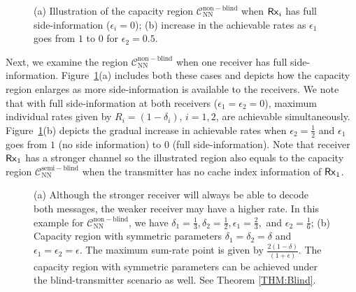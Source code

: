 \documentclass[journal,12pt,draftcls,onecolumn]{IEEEtran}
\begin{document}
\begin{figure}[!ht]
\centering
{}
\caption{(a) Illustration of the capacity region $\mathcal{C}^{\mathrm{non-blind}}_{\mathrm{NN}}$ when ${\sf Rx}_i$ has full side-information ($\epsilon_i = 0$); (b) increase in the achievable rates as $\epsilon_1$ goes from $1$ to $0$ for $\epsilon_2 = 0.5$.\label{Fig:Example1}}
\end{figure}

Next, we examine the region $\mathcal{C}^{\mathrm{non-blind}}_{\mathrm{NN}}$ when one receiver has full side-information. Figure~\ref{Fig:Example1}(a) includes both these cases and depicts how the capacity region enlarges as more side-information is available to the receivers. We note that with full side-information at both receivers ($\epsilon_1 = \epsilon_2 = 0$), maximum individual rates given by $R_i = (1 - \delta_i)$, $i=1,2$, are achievable simultaneously. Figure~\ref{Fig:Example1}(b) depicts the gradual increase in achievable rates when $\epsilon_2 = \frac{1}{2}$ and $\epsilon_1$ goes from $1$ (no side information) to $0$ (full side-information).
Note that receiver ${\sf Rx}_1$ has a stronger channel so the illustrated region also equals to the capacity region $\mathcal{C}^{\mathrm{semi-blind}}_{\mathrm{NN}}$ when the transmitter has no cache index information of ${\sf Rx}_1$.



\begin{figure}[!ht]
\centering
{}
\caption{(a) Although the stronger receiver will always be able to decode both messages, the weaker receiver may have a higher rate. In this example for $\mathcal{C}^{\mathrm{non-blind}}_{\mathrm{NN}}$, we have $\delta_1 = \frac{1}{3}, \delta_2 = \frac{1}{2}, \epsilon_1 = \frac{2}{3},$ and $\epsilon_2 = \frac{1}{6}$; (b) Capacity region with symmetric parameters $\delta_1 = \delta_2 = \delta$ and $\epsilon_1 = \epsilon_2 = \epsilon$. The maximum sum-rate point is given by $\frac{2(1-\delta)}{(1+\epsilon)}$. The capacity region with symmetric parameters can be achieved under the blind-transmitter scenario as well. See Theorem \ref{THM:Blind}.\label{Fig:Example2}}
\end{figure}
\end{document}
